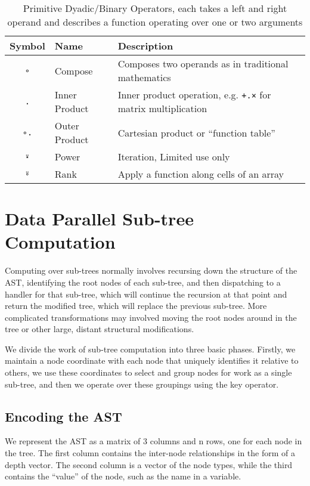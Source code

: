\documentclass[numbers,preprint]{sigplanconf}
\begin{document}
\begin{table*}
\centering
\begin{tabular}{cll}
\toprule
Symbol     & Name & Description \\
\midrule
\texttt{∘} & Compose & Composes two operands as in traditional mathematics \\
\texttt{.} & Inner Product & Inner product operation, e.g.
 \texttt{+.×} for matrix multiplication \\
\texttt{∘.} & Outer Product & Cartesian product or ``function table'' \\
\texttt{⍣} & Power & Iteration, Limited use only \\
\texttt{⍤} & Rank & Apply a function along cells of an array \\
\end{tabular}
\caption{Primitive Dyadic/Binary Operators, each takes a left
 and right operand and describes a function operating over one or two arguments}
\label{tab:conjunctions}
\end{table*}

\section{Data Parallel Sub-tree Computation}

Computing over sub-trees normally involves recursing down the structure of 
the AST, identifying the root nodes of each sub-tree, and then dispatching
to a handler for that sub-tree, which will continue the recursion at that 
point and return the modified tree, which will replace the previous 
sub-tree. More complicated transformations may involved moving the root 
nodes around in the tree or other large, distant structural modifications. 

We divide the work of sub-tree computation into three basic phases. Firstly, 
we maintain a node coordinate with each node that uniquely identifies it 
relative to others, we use these coordinates to select and group nodes for 
work as a single sub-tree, and then we operate over these groupings using 
the key operator.

\subsection{Encoding the AST}

We represent the AST as a matrix of 3 columns and n rows, one for
each node in the tree. The first column contains the inter-node
relationships in the form of a depth vector. The second column is a
vector of the node types, while the third contains the ``value''
of the node, such as the name in a variable.
\end{document}
